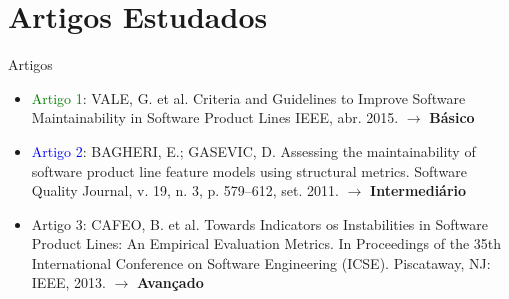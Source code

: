 \section{Artigos Estudados}
\begin{frame}[t, fragile]{Artigos}
    \begin{itemize}
      \item \textcolor{Green}{Artigo 1}: VALE, G. et al. Criteria and Guidelines to Improve Software Maintainability in Software Product Lines IEEE, abr. 2015. $\rightarrow$ \textbf{Básico}
      \item \textcolor{Blue}{Artigo 2}: BAGHERI, E.; GASEVIC, D. Assessing the maintainability of software product line feature models using structural metrics. Software Quality Journal, v. 19, n. 3, p. 579–612, set. 2011. $\rightarrow$ \textbf{Intermediário}
      \item \alert{Artigo 3}: CAFEO, B. et al. Towards Indicators os Instabilities in Software Product Lines: An Empirical Evaluation Metrics.  In Proceedings of the 35th International Conference on Software Engineering (ICSE). Piscataway, NJ: IEEE, 2013. $\rightarrow$ \textbf{Avançado}

    \end{itemize}
\end{frame}

